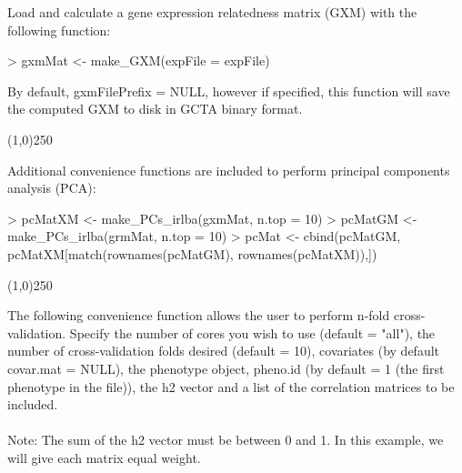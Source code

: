 \documentclass[a4paper]{article}
\begin{document}
Load and calculate a gene expression relatedness matrix (GXM) with the following function:
\begin{Schunk}

\begin{Schunk}
\begin{Sinput}
> gxmMat <- make_GXM(expFile = expFile)
\end{Sinput}
\end{Schunk}

\end{Schunk}
By default, gxmFilePrefix = NULL, however if specified, this function will save the computed GXM to disk in GCTA binary format.
\begin{center}
\line(1,0){250}
\end{center}
Additional convenience functions are included to perform principal components analysis (PCA):
\begin{Schunk}

\begin{Schunk}
\begin{Sinput}
> pcMatXM <- make_PCs_irlba(gxmMat, n.top = 10)
> pcMatGM <- make_PCs_irlba(grmMat, n.top = 10)
> pcMat <- cbind(pcMatGM, pcMatXM[match(rownames(pcMatGM), rownames(pcMatXM)),])
\end{Sinput}
\end{Schunk}

\end{Schunk}
\begin{center}
\line(1,0){250}
\end{center}
The following convenience function allows the user to perform n-fold cross-validation. Specify the number of cores you wish to use (default = "all"), the number of cross-validation folds desired (default = 10), covariates (by default covar.mat = NULL), the phenotype object, pheno.id (by default = 1 (the first phenotype in the file)), the h2 vector and a list of the correlation matrices to be included.
 \\
\\
Note: The sum of the h2 vector must be between 0 and 1. In this example, we will give each matrix equal weight.
\end{document}

